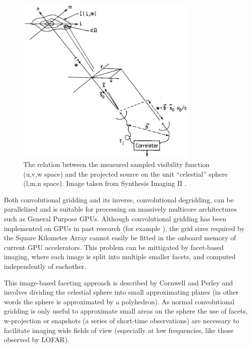 \documentclass[a4paper, two column]{article}
\begin{document}
\begin{figure}
 \begin{mdframed}
 \centering
 \includegraphics[width=0.8\textwidth]{lmn_uvw.png}
 \caption[The relation between image space and visibilities]{The relation between the measured sampled visibility function (u,v,w space) and the projected source on the unit ``celestial'' sphere (l,m,n space). Image taken from Synthesis Imaging II \cite{taylor1999synthesis}.}
  \label{FIG_APERTURE_SYNTH}
 \end{mdframed}
\end{figure}

Both convolutional gridding and its inverse, convolutional degridding, can be parallelized and is suitable for processing on massively multicore architectures such as General Purpose GPUs. Although convolutional gridding 
has been implemented on GPUs in past research (for example \cite{romein2012efficient}), the grid sizes required by the Square Kilometer Array cannot easily be fitted in the onboard memory of current GPU accelerators. This problem can be mittigated by facet-based
imaging, where each image is split into multiple smaller facets, and computed independently of eachother. 

This image-based faceting approach is described by Cornwell and Perley \cite{cornwell1992radio} and involves dividing the celestial sphere into small approximating planes (in other words the sphere is approximated by a polyhedron). 
As normal convolutional gridding is only useful to approximate small areas on the sphere the use of facets, w-projection \cite{cornwell2005w} or snapshots (a series of short-time observations) are 
necessary to facilitate imaging wide fields of view (especially at low frequencies, like those observed by LOFAR). 
\end{document}
